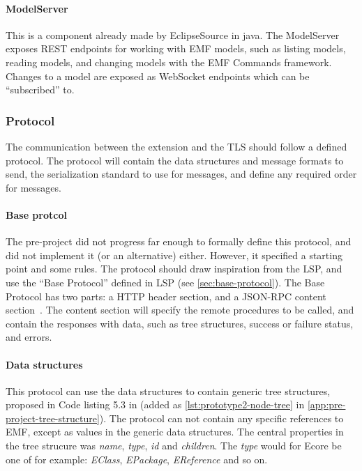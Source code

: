 \paragraph{ModelServer}
This is a component already made by EclipseSource in java.
The ModelServer exposes \gls{REST} endpoints for working with \acrshort{EMF} models, such as listing models, reading models, and changing models with the EMF Commands framework.
Changes to a model are exposed as \gls{WebSocket} endpoints which can be ``subscribed'' to.


\subsubsection{Protocol}
The communication between the extension and the TLS should follow a defined protocol.
The protocol will contain the data structures and message formats to send, the serialization standard to use for messages, and define any required order for messages.


\paragraph{Base protcol}
The pre-project did not progress far enough to formally define this protocol, and did not implement it (or an alternative) either.
However, it specified a starting point and some rules.
The protocol should draw inspiration from the \acrlong{LSP}, and use the ``Base Protocol'' defined in \acrshort{LSP} (see \cref{sec:base-protocol}).
The Base Protocol has two parts: a HTTP header section, and a \gls{JSON-RPC} content section~\cite[p.~17,18]{rekstadModelingEnvironmentCloud2020}.
The content section will specify the remote procedures to be called, and contain the responses with data, such as tree structures, success or failure status, and errors.


\paragraph{Data structures}
This protocol can use the data structures to contain generic tree structures, proposed in Code listing 5.3 in \cite[p.~43,44]{rekstadModelingEnvironmentCloud2020} (added as \cref{lst:prototype2-node-tree} in \cref{app:pre-project-tree-structure}).
The protocol can not contain any specific references to \acrshort{EMF}, except as values in the generic data structures.
The central properties in the tree strucure was \textit{name}, \textit{type}, \textit{id} and \textit{children}.
The \textit{type} would for \gls{Ecore} be one of for example: \textit{EClass}, \textit{EPackage}, \textit{EReference} and so on.\\


